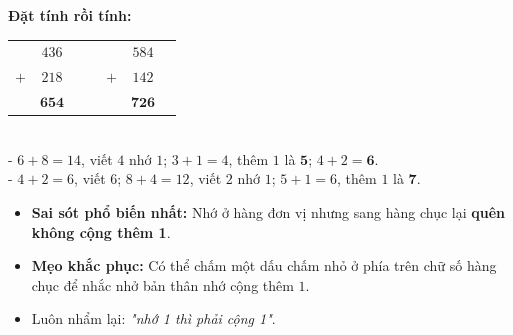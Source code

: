 \documentclass[10pt,a4paper]{article}
\begin{document}
\vspace{-1.5mm}
\noindent
\begin{minipage}[t]{0.49\textwidth}\vspace{0pt}
\begin{tcolorbox}[
  enhanced,
  colback=green!4!white,
  colframe=green!60!black,
  arc=2mm, boxrule=0.8pt,
  left=2mm, right=2mm, top=1.8mm, bottom=1.8mm,
  title={\footnotesize\bfseries\color{white}\faCheckCircle\ 4. Ví dụ thực hành đặt tính}
]
{\footnotesize
\textbf{Đặt tính rồi tính:}\\
\begin{tabular}{r@{\,}c@{\,}lcr@{\,}c@{\,}l}
  & $436$ & & & & $584$ & \\
$+$ & $218$ & & &$+$ & $142$ & \\
\cline{1-3}\cline{5-7}
  & $\mathbf{654}$ & & & & $\mathbf{726}$ &
\end{tabular}
\vspace{1mm}\\
- $6 + 8 = 14$, viết $4$ nhớ $1$; $3 + 1 = 4$, thêm $1$ là $\mathbf{5}$; $4 + 2 = \mathbf{6}$.\\
- $4 + 2 = 6$, viết $6$; $8 + 4 = 12$, viết $2$ nhớ $1$; $5 + 1 = 6$, thêm $1$ là $\mathbf{7}$.
}
\end{tcolorbox}
\end{minipage}
\hfill
\begin{minipage}[t]{0.49\textwidth}\vspace{0pt}
\begin{tcolorbox}[
  enhanced,
  colback=rose!4!white,
  colframe=rose!70!black,
  arc=2mm, boxrule=0.8pt,
  left=2mm, right=2mm, top=1.8mm, bottom=1.8mm,
  title={\footnotesize\bfseries\color{white}\faExclamationTriangle\ 5. Lỗi quên cộng số nhớ}
]
{\footnotesize
\begin{itemize}\setlength{\itemsep}{1.5pt}\setlength{\leftskip}{-2.5mm}
  \item \textbf{Sai sót phổ biến nhất:} Nhớ ở hàng đơn vị nhưng sang hàng chục lại \textbf{quên không cộng thêm 1}.
  \item \textbf{Mẹo khắc phục:} Có thể chấm một dấu chấm nhỏ ở phía trên chữ số hàng chục để nhắc nhở bản thân nhớ cộng thêm $1$.
  \item Luôn nhẩm lại: \textit{"nhớ 1 thì phải cộng 1"}.
\end{itemize}
}
\end{tcolorbox}
\end{minipage}
\end{document}
